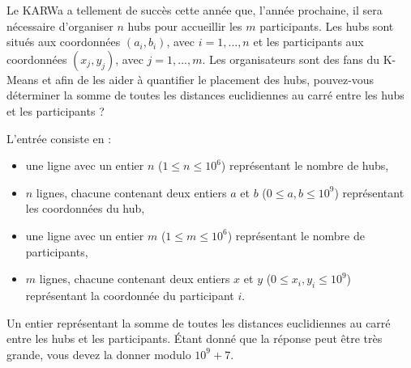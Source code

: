 \problemname{\problemyamlname}


Le KARWa a tellement de succès cette année que, l'année prochaine, il sera nécessaire d'organiser $n$ hubs pour
accueillir les $m$ participants. Les hubs sont situés aux coordonnées $(a_i , b_i )$, avec $i = 1, \dots, n$ et les participants aux coordonnées $(x_j , y_j )$, avec $j = 1, ..., m$.
Les organisateurs sont des fans du K-Means et afin de les aider à quantifier le placement des hubs, pouvez-vous
déterminer la somme de toutes les distances euclidiennes au carré entre les hubs et les participants ?
\begin{Input}
    L'entrée consiste en :
    \begin{itemize}
      \item une ligne avec un entier $n$ ($1 \leq n \leq 10^{6}$) représentant le nombre de hubs,
      \item $n$ lignes, chacune contenant deux entiers $a$ et $b$ ($0 \leq a, b\leq 10^{9}$) représentant les coordonnées du hub,
      \item une ligne avec un entier $m$ ($1 \leq m \leq 10^{6}$)  représentant le nombre de participants,
      \item $m$ lignes, chacune contenant deux entiers $x$ et $y$ ($0 \leq x_i, y_i\leq 10^{9}$) représentant la coordonnée du participant $i$.
    \end{itemize}
\end{Input}

\begin{Output}
Un entier représentant la somme de toutes les distances euclidiennes au carré entre les hubs et les participants. Étant donné que la réponse peut être très grande, vous devez la donner modulo $10^9 + 7$.
\end{Output}
